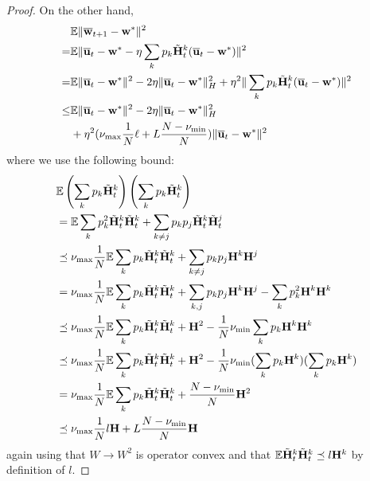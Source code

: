 \begin{proof}
	On the other hand, 
	\begin{align*}
	&\mathbb{E}\|{\overline{\mathbf{w}}}_{t+1}-{\mathbf{w}}^{\ast}\|^{2} \\
	=&\mathbb{E}\|{\overline{\mathbf{u}}}_{t}-{\mathbf{w}}^{\ast}-\eta\sum_{k}p_{k}\tilde{{\mathbf{H}}}_{t}^{k}({\overline{\mathbf{u}}}_{t}-{\mathbf{w}}^{\ast})\|^{2}\\
	=&\mathbb{E}\|{\overline{\mathbf{u}}}_{t}-{\mathbf{w}}^{\ast}\|^{2}-2\eta\|{\overline{\mathbf{u}}}_{t}-{\mathbf{w}}^{\ast}\|_{H}^{2}+\eta^{2}\|\sum_{k}p_{k}\tilde{{\mathbf{H}}}_{t}^{k}({\overline{\mathbf{u}}}_{t}-{\mathbf{w}}^{\ast})\|^{2}\\
	\leq&	\mathbb{E}\|{\overline{\mathbf{u}}}_{t}-{\mathbf{w}}^{\ast}\|^{2}-2\eta\|{\overline{\mathbf{u}}}_{t}-{\mathbf{w}}^{\ast}\|_{H}^{2}\\
	&+\eta^{2}(\nu_{\max}\frac{1}{N}\ell+L\frac{N-\nu_{\min}}{N})\|{\overline{\mathbf{u}}}_{t}-{\mathbf{w}}^{\ast}\|^{2}
	\end{align*}
	where we use the following bound: 
	\begin{align*}
	& \mathbb{E}\left(\sum_{k}p_{k}\tilde{{\mathbf{H}}}_{t}^{k}\right)\left(\sum_{k}p_{k}\tilde{{\mathbf{H}}}_{t}^{k}\right)\\
	& =\mathbb{E}\sum_{k}p_{k}^{2}\tilde{{\mathbf{H}}}_{t}^{k}\tilde{{\mathbf{H}}}_{t}^{k}+\sum_{k\neq j}p_{k}p_{j}\tilde{{\mathbf{H}}}_{t}^{k}\tilde{{\mathbf{H}}}_{t}^{j}\\
	& \preceq\nu_{\max}\frac{1}{N}\mathbb{E}\sum_{k}p_{k}\tilde{{\mathbf{H}}}_{t}^{k}\tilde{{\mathbf{H}}}_{t}^{k}+\sum_{k\neq j}p_{k}p_{j}{\mathbf{H}}^{k}{\mathbf{H}}^{j}\\
	& =\nu_{\max}\frac{1}{N}\mathbb{E}\sum_{k}p_{k}\tilde{{\mathbf{H}}}_{t}^{k}\tilde{{\mathbf{H}}}_{t}^{k}+\sum_{k,j}p_{k}p_{j}{\mathbf{H}}^{k}{\mathbf{H}}^{j}-\sum_{k}p_{k}^{2}{\mathbf{H}}^{k}{\mathbf{H}}^{k}\\
	& \preceq\nu_{\max}\frac{1}{N}\mathbb{E}\sum_{k}p_{k}\tilde{{\mathbf{H}}}_{t}^{k}\tilde{{\mathbf{H}}}_{t}^{k}+{\mathbf{H}}^{2}-\frac{1}{N}\nu_{\min}\sum_{k}p_{k}{\mathbf{H}}^{k}{\mathbf{H}}^{k}\\
	& \preceq\nu_{\max}\frac{1}{N}\mathbb{E}\sum_{k}p_{k}\tilde{{\mathbf{H}}}_{t}^{k}\tilde{{\mathbf{H}}}_{t}^{k}+{\mathbf{H}}^{2}-\frac{1}{N}\nu_{\min}(\sum_{k}p_{k}{\mathbf{H}}^{k})(\sum_{k}p_{k}{\mathbf{H}}^{k})\\
	& =\nu_{\max}\frac{1}{N}\mathbb{E}\sum_{k}p_{k}\tilde{{\mathbf{H}}}_{t}^{k}\tilde{{\mathbf{H}}}_{t}^{k}+\frac{N-\nu_{\min}}{N}{\mathbf{H}}^{2}\\
	& \preceq\nu_{\max}\frac{1}{N}l{\mathbf{H}}+L\frac{N-\nu_{\min}}{N}{\mathbf{H}}
	\end{align*}
	again using that $W\rightarrow W^{2}$ is operator convex and that
	$\mathbb{E}\tilde{{\mathbf{H}}}_{t}^{k}\tilde{{\mathbf{H}}}_{t}^{k}\preceq l{\mathbf{H}}^{k}$ by definition
	of $l$. 
	

\end{proof}
